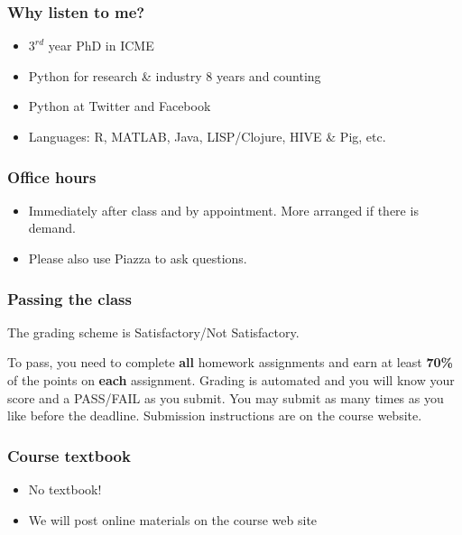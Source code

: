 \documentclass{beamer}
\begin{document}
\begin{frame}
\frametitle{Why listen to me?}

\begin{itemize}
\setlength{\itemsep}{0.1in}
\item{$3^{rd}$ year PhD in ICME}
\item{Python for research \& industry 8 years and counting}
\item{Python at Twitter and Facebook}
\item{Languages: R, MATLAB, Java, LISP/Clojure, HIVE \& Pig, etc.} 
\end{itemize}
\end{frame}


\begin{frame}
\frametitle{Office hours}

\begin{itemize}
\setlength{\itemsep}{0.2in}
\item{Immediately after class and by appointment. More arranged if there is demand.}
\item{Please also use Piazza to ask questions.}
\end{itemize}

\end{frame}


\begin{frame}
\frametitle{Passing the class}

The grading scheme is Satisfactory/Not Satisfactory.

\vspace{0.2in}

To pass, you need to complete \textbf{all} homework assignments and earn at least \textbf{70\%} of the points on \textbf{each} assignment. Grading is automated and you will know your score and a PASS/FAIL as you submit. You may submit as many times as you like before the deadline. Submission instructions are on the course website. 

\end{frame}


\begin{frame}
\frametitle{Course textbook}

\begin{itemize}
\setlength{\itemsep}{0.2in}
\item{No textbook!}
\item{We will post online materials on the course web site}
\end{itemize}

\end{frame}
\end{document}
